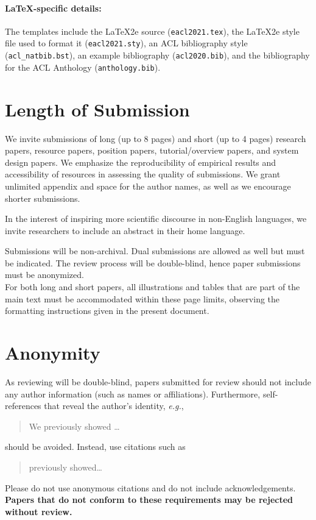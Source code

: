 \documentclass[11pt,a4paper]{article}
\begin{document}
\paragraph{\LaTeX-specific details:}
The templates include the \LaTeX2e{} source (\texttt{\small eacl2021.tex}),
the \LaTeX2e{} style file used to format it (\texttt{\small eacl2021.sty}),
an ACL bibliography style (\texttt{\small acl\_natbib.bst}),
an example bibliography (\texttt{\small acl2020.bib}),
and the bibliography for the ACL Anthology (\texttt{\small anthology.bib}).


\section{Length of Submission}
\label{sec:length}
We invite submissions of long (up to 8 pages) and short (up to 4 pages) research papers, resource papers, position papers, tutorial/overview papers, and system design papers. We emphasize the reproducibility of empirical results and accessibility of resources in assessing the quality of submissions. We grant unlimited appendix and space for the author names, as well as we encourage shorter submissions. 

In the interest of inspiring more scientific discourse in non-English languages, we invite researchers to include an abstract in their home language.

Submissions will be non-archival. Dual submissions are allowed as well but must be indicated. The review process will be double-blind, hence paper submissions must be anonymized.
\\

For both long and short papers, all illustrations and tables that are part of the main text must be accommodated within these page limits, observing the formatting instructions given in the present document.

\section{Anonymity}
As reviewing will be double-blind, papers submitted for review should not include any author information (such as names or affiliations). Furthermore, self-references that reveal the author's identity, \emph{e.g.},
\begin{quote}
We previously showed \citep{Gusfield:97} \ldots
\end{quote}
should be avoided. Instead, use citations such as 
\begin{quote}
\citet{Gusfield:97} previously showed\ldots
\end{quote}
Please do not use anonymous citations and do not include acknowledgements.
\textbf{Papers that do not conform to these requirements may be rejected without review.}
\end{document}
